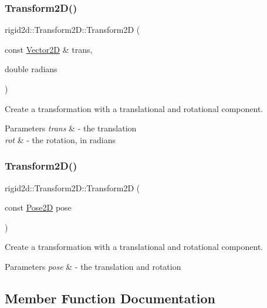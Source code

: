 \subsubsection{\texorpdfstring{Transform2\+D()}{Transform2D()}\hspace{0.1cm}{\footnotesize\ttfamily [3/4]}}
{\footnotesize\ttfamily rigid2d\+::\+Transform2\+D\+::\+Transform2D (\begin{DoxyParamCaption}\item[{const \hyperlink{structrigid2d_1_1Vector2D}{Vector2D} \&}]{trans,  }\item[{double}]{radians }\end{DoxyParamCaption})}



Create a transformation with a translational and rotational component. 


\begin{DoxyParams}{Parameters}
{\em trans} & -\/ the translation \\
\hline
{\em rot} & -\/ the rotation, in radians \\
\hline
\end{DoxyParams}
\mbox{\label{classrigid2d_1_1Transform2D_a7eee10e3bf1cfdc0df928b9401750dba}} 
\subsubsection{\texorpdfstring{Transform2\+D()}{Transform2D()}\hspace{0.1cm}{\footnotesize\ttfamily [4/4]}}
{\footnotesize\ttfamily rigid2d\+::\+Transform2\+D\+::\+Transform2D (\begin{DoxyParamCaption}\item[{const \hyperlink{structrigid2d_1_1Pose2D}{Pose2D}}]{pose }\end{DoxyParamCaption})}



Create a transformation with a translational and rotational component. 


\begin{DoxyParams}{Parameters}
{\em pose} & -\/ the translation and rotation \\
\hline
\end{DoxyParams}


\subsection{Member Function Documentation}
\mbox{\label{classrigid2d_1_1Transform2D_adb4a148944f3629222080db727397f0a}} 
